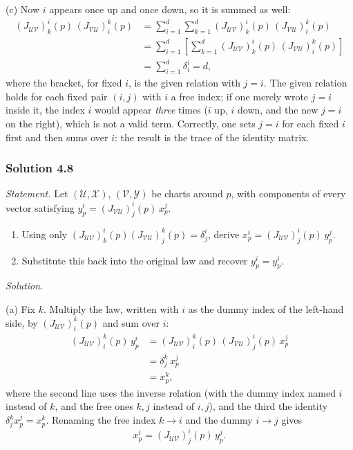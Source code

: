 \documentclass[11pt]{article}
\begin{document}
(c) Now $i$ appears once up and once down, so it is summed as well:
\begin{align*}
(J_{\mathcal{UV}})^i_k(p)\,(J_{\mathcal{VU}})^k_i(p)
&=\sum_{i=1}^d\sum_{k=1}^d(J_{\mathcal{UV}})^i_k(p)\,(J_{\mathcal{VU}})^k_i(p)\\
&=\sum_{i=1}^d\left[\sum_{k=1}^d(J_{\mathcal{UV}})^i_k(p)\,(J_{\mathcal{VU}})^k_i(p)\right]\\
&=\sum_{i=1}^d\delta^i_i=d,
\end{align*}
where the bracket, for fixed $i$, is the given relation with $j=i$. The
given relation holds for each fixed pair $(i,j)$ with $i$ a free index; if
one merely wrote $j=i$ inside it, the index $i$ would appear \emph{three}
times ($i$ up, $i$ down, and the new $j=i$ on the right), which is not a
valid term. Correctly, one sets $j=i$ for each fixed $i$ first and then sums
over $i$: the result is the trace of the identity matrix.

\subsubsection*{Solution 4.8}

\noindent\textit{Statement.} Let $(\mathcal U,\mathcal X)$, $(\mathcal
V,\mathcal Y)$ be charts around $p$, with components of every vector
satisfying $y^i_p=(J_{\mathcal{VU}})^i_j(p)\,x^j_p$.
\begin{enumerate}[label=(\alph*)]
  \item Using only $(J_{\mathcal{UV}})^i_k(p)(J_{\mathcal{VU}})^k_j(p)=
  \delta^i_j$, derive $x^i_p=(J_{\mathcal{UV}})^i_j(p)\,y^j_p$.
  \item Substitute this back into the original law and recover
  $y^i_p=y^i_p$.
\end{enumerate}

\medskip
\noindent\textit{Solution.}

(a) Fix $k$. Multiply the law, written with $i$ as the dummy index of the
left-hand side, by $(J_{\mathcal{UV}})^k_i(p)$ and sum over $i$:
\begin{align*}
(J_{\mathcal{UV}})^k_i(p)\,y^i_p
&=(J_{\mathcal{UV}})^k_i(p)\,(J_{\mathcal{VU}})^i_j(p)\,x^j_p\\
&=\delta^k_j\,x^j_p\\
&=x^k_p,
\end{align*}
where the second line uses the inverse relation (with the dummy index
named $i$ instead of $k$, and the free ones $k,j$ instead of $i,j$), and the
third the identity $\delta^k_jx^j_p=x^k_p$. Renaming the free index $k\to i$
and the dummy $i\to j$ gives
\[
x^i_p=(J_{\mathcal{UV}})^i_j(p)\,y^j_p.
\]
\end{document}
